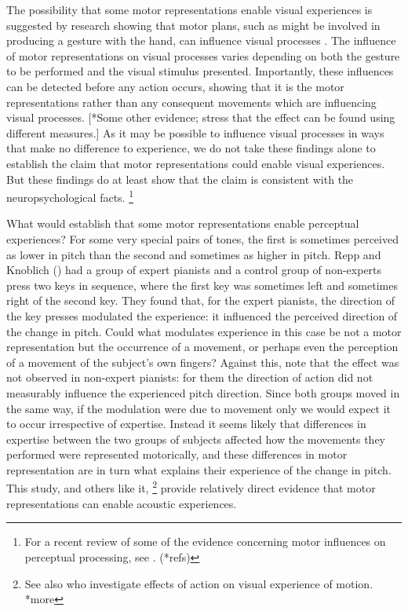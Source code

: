 \documentclass[12pt,\papersize]{extarticle}
\begin{document}
The possibility that some motor representations enable visual experiences is suggested by research showing that motor plans, such as might be involved in producing a gesture with the hand, can influence visual processes \citep{bortoletto:2011_action}. The influence of motor representations on visual processes varies depending on both the gesture to be performed and the visual stimulus presented. Importantly, these influences can be detected before any action occurs, showing that it is the motor representations rather than any consequent movements which are influencing visual processes. [*Some other evidence; stress that the effect can be found using different measures.]  As it may be possible to influence visual processes in ways that make no difference to experience, we do not take these findings alone to establish the claim that motor representations could enable visual experiences.  But these findings do at least show that the claim is consistent with the neuropsychological facts.%
\footnote{
For a recent review of some of the evidence concerning motor influences on perceptual processing, see \citet{halasz:2012_unconscious}. (*refs)
}  

What would establish that some motor representations enable perceptual experiences? For some very special pairs of tones, the first is sometimes perceived as lower in pitch than the second and sometimes as higher in pitch.  Repp and Knoblich (\citeyear{repp:2007_action}) had a group of expert pianists and a control group of non-experts press two keys in sequence, where the first key was sometimes left and sometimes right of the second key.  They found that, for the expert pianists, the direction of the key presses modulated the experience: it influenced the perceived direction of the change in pitch. Could what modulates experience in this case be not a motor representation but the occurrence of a movement, or perhaps even the perception of a movement of the subject's own fingers?  Against this, note that the effect was not observed in non-expert pianists: for them the direction of action did not measurably influence the experienced pitch direction. Since both groups moved in the same way, if the modulation were due to movement only we would expect it to occur irrespective of expertise. Instead it seems likely that differences in expertise between the two groups of subjects affected how the movements they performed were represented motorically, and these differences in motor representation are in turn what explains their experience of the change in pitch.  This study, and others like it,%
\footnote{
See also \citet{zwickel:2010_interference} who investigate effects of action on visual experience of motion.  *more
} 
provide relatively direct evidence that motor representations can enable acoustic experiences.
\end{document}
